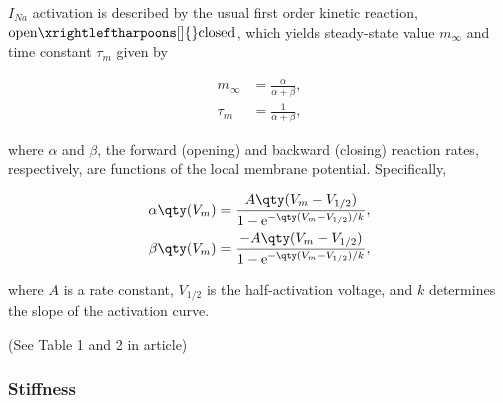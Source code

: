 $I_{Na}$ activation is described by the usual first order kinetic reaction, $\text{open} \xrightleftharpoons[]{} \text{closed}$, which yields steady-state value $m_\infty$ and time constant $\tau_m$ given by 

\begin{align*}
    m_\infty &= \frac{\alpha}{\alpha + \beta}, 
    \\ 
    \tau_m &= \frac{1}{\alpha + \beta},
\end{align*}

where $\alpha$ and $\beta$, the forward (opening) and backward (closing) reaction rates, respectively, are functions of the local membrane potential. Specifically, 

\begin{align*}
    \alpha \qty(V_m) &= \frac{A \qty(V_m - V_{1/2})}{1 - \mathrm{e}^{- \qty(V_m - V_{1/2})/k}},
    \\
    \beta \qty(V_m) &= \frac{-A \qty(V_m - V_{1/2})}{1 - \mathrm{e}^{- \qty(V_m - V_{1/2})/k}},
\end{align*}

where $A$ is a rate constant, $V_{1/2}$ is the half-activation voltage, and $k$ determines the slope of the activation curve. 

(See Table 1 and 2 in article)







\subsubsection{Stiffness}

